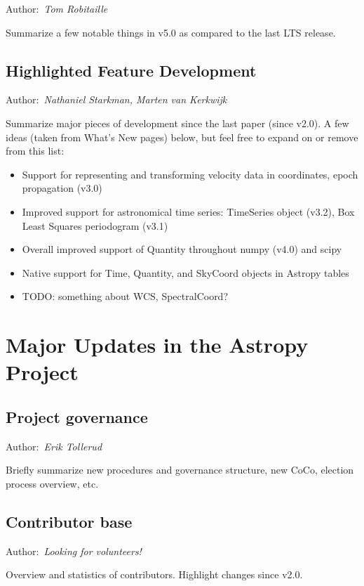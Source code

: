 \documentclass[modern]{aastex631}
\newcommand{\secauthor}[1]{{\color{blue}Author:~\textit{#1}}}
\newcommand{\secunfilled}{{\color{red}Author:~\textit{Looking for volunteers!}}}
\begin{document}
\secauthor{Tom Robitaille}

Summarize a few notable things in v5.0 as compared to the last LTS release.


\subsection{Highlighted Feature Development} \label{sec:core-features}

\secauthor{Nathaniel Starkman, Marten van Kerkwijk}

Summarize major pieces of development since the last paper (since v2.0). A few
ideas (taken from What's New pages) below, but feel free to expand on or remove
from this list:
\begin{itemize}
    \item Support for representing and transforming velocity data in coordinates, epoch propagation (v3.0)
    \item Improved support for astronomical time series: TimeSeries object (v3.2), Box Least Squares periodogram (v3.1)
    \item Overall improved support of Quantity throughout numpy (v4.0) and scipy
    \item Native support for Time, Quantity, and SkyCoord objects in Astropy tables
    \item TODO: something about WCS, SpectralCoord?
\end{itemize}


\section{Major Updates in the Astropy Project} \label{sec:project-updates}

\subsection{Project governance} \label{sec:project-governance}

\secauthor{Erik Tollerud}

Briefly summarize new procedures and governance structure, new CoCo, election
process overview, etc.

\subsection{Contributor base} \label{sec:project-contributors}

\secunfilled

Overview and statistics of contributors. Highlight changes since v2.0.
\end{document}
